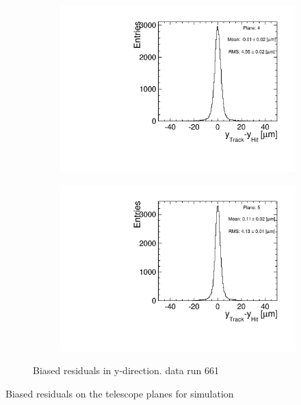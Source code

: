 \begin{figure}[htbp]
\begin{subfigure}[b]{0.3\textwidth}
    \includegraphics[width=\textwidth]{figures/Telescope/biasedResiduals/BiasedResiduals_run661_PlaneYRMS4.pdf}
    \caption{}
  \end{subfigure}\hfill
  \begin{subfigure}[b]{0.3\textwidth}
    \includegraphics[width=\textwidth]{figures/Telescope/biasedResiduals/BiasedResiduals_run661_PlaneYRMS5.pdf}
    \caption{}
  \end{subfigure}
  \caption{Biased residuals in y-direction. data run 661}
  \label{fig:telescope_biasedResiduals_data_Y}
\end{figure}



Biased residuals on the telescope planes for simulation


